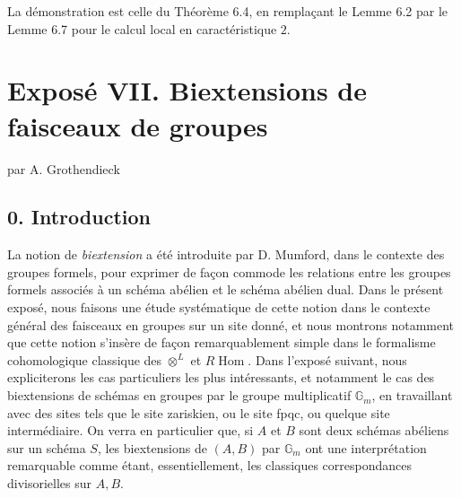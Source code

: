\documentclass[11pt]{article}
\providecommand{\Gm}{\mathbb G_m}
\providecommand{\pr}{\operatorname{pr}}
\providecommand{\Ens}{\mathrm{Ens}}
\providecommand{\id}{\operatorname{id}}
\begin{document}
La démonstration est celle du Théorème 6.4, en remplaçant le Lemme 6.2 par le Lemme 6.7 pour le calcul local en caractéristique \(2\).



\providecommand{\T}{\mathcal T}
\providecommand{\U}{\mathcal U}
\providecommand{\e}{\mathrm e}
\providecommand{\Ens}{\operatorname{Ens}}
\providecommand{\Alg}{\operatorname{Alg}}
\providecommand{\Homens}{\operatorname{Hom}_{\mathrm{ens}}}
\providecommand{\Homalg}{\operatorname{Hom}_{\mathrm{alg}}}
\providecommand{\Hompt}{\operatorname{Hom}_{\mathrm{pt}}}
\providecommand{\EXT}{\operatorname{EXT}}
\providecommand{\TORS}{\operatorname{TORS}}
\providecommand{\BITORSRIG}{\operatorname{BITORSRIG}}
\providecommand{\BITORSBIRIG}{\operatorname{BITORSBIRIG}}
\providecommand{\BITORS}{\operatorname{BITORS}}
\providecommand{\pr}{\operatorname{pr}}
\providecommand{\id}{\mathrm{id}}
\providecommand{\sym}{\mathrm{sym}}
\providecommand{\h}{\mathrm h}
\providecommand{\cA}{\mathcal A}
\providecommand{\cB}{\mathcal B}


\section*{Exposé VII. Biextensions de faisceaux de groupes}
\begin{center}
par A. Grothendieck
\end{center}

\subsection*{0. Introduction}

La notion de \emph{biextension} a été introduite par D. Mumford, dans le contexte des groupes formels, pour exprimer de façon commode les relations entre les groupes formels associés à un schéma abélien et le schéma abélien dual.  Dans le présent exposé, nous faisons une étude systématique de cette notion dans le contexte général des faisceaux en groupes sur un site donné, et nous montrons notamment que cette notion s'insère de façon remarquablement simple dans le formalisme cohomologique classique des \(\otimes^{L}\) et \(R\!\operatorname{Hom}\).  Dans l'exposé suivant, nous expliciterons les cas particuliers les plus intéressants, et notamment le cas des biextensions de schémas en groupes par le groupe multiplicatif \(\Gm\), en travaillant avec des sites tels que le site zariskien, ou le site fpqc, ou quelque site intermédiaire.  On verra en particulier que, si \(A\) et \(B\) sont deux schémas abéliens sur un schéma \(S\), les biextensions de \((A,B)\) par \(\Gm\) ont une interprétation remarquable comme étant, essentiellement, les classiques correspondances divisorielles sur \(A,B\).
\end{document}
